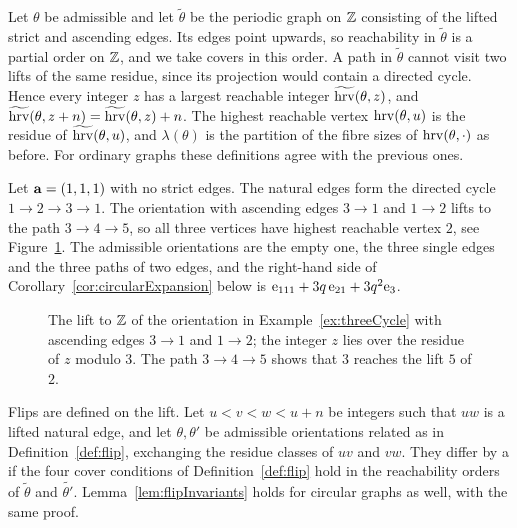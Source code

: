 Let $\theta$ be admissible and let $\widetilde{\theta}$ be the periodic
graph on $\mathbb{Z}$ consisting of the lifted strict and ascending edges.
Its edges point upwards, so reachability in $\widetilde{\theta}$ is a
partial order on $\mathbb{Z}$, and we take covers in this order.
A path in $\widetilde{\theta}$ cannot visit two lifts of the same residue,
since its projection would contain a directed cycle.
Hence every integer $z$ has a largest reachable integer
$\widetilde{\operatorname{hrv}}(\theta,z)$, and
$\widetilde{\operatorname{hrv}}(\theta,z+n)=\widetilde{\operatorname{hrv}}(\theta,z)+n$.
The highest reachable vertex $\operatorname{hrv}(\theta,u)$ is the residue of
$\widetilde{\operatorname{hrv}}(\theta,u)$, and $\lambda(\theta)$ is the partition of the
fibre sizes of $\operatorname{hrv}(\theta,\cdot)$ as before.
For ordinary graphs these definitions agree with the previous ones.

\begin{example}\label{ex:threeCycle}
Let $\mathbf{a}=(1,1,1)$ with no strict edges.
The natural edges form the directed cycle $1\to2\to3\to1$.
The orientation with ascending edges $3\to1$ and $1\to2$ lifts to the path
$3\to4\to5$, so all three vertices have highest reachable vertex $2$, see
Figure~\ref{fig:lift}.
The admissible orientations are the empty one, the three single edges and the
three paths of two edges, and the right-hand side of
Corollary~\ref{cor:circularExpansion} below is
$\mathrm{e}_{111}+3q\,\mathrm{e}_{21}+3q^2\mathrm{e}_3$.
\end{example}

\begin{figure}[!ht]
\centering
{}
\caption{The lift to $\mathbb{Z}$ of the orientation in Example~\ref{ex:threeCycle}
with ascending edges $3\to1$ and $1\to2$; the integer $z$ lies over the residue
of $z$ modulo $3$.
The path $3\to4\to5$ shows that $3$ reaches the lift $5$ of $2$.}
\label{fig:lift}
\end{figure}

Flips are defined on the lift.
Let $u<v<w<u+n$ be integers such that $uw$ is a lifted natural edge, and let
$\theta,\theta'$ be admissible orientations related as in
Definition~\ref{def:flip}, exchanging the residue classes of $uv$ and $vw$.
They differ by a  if the four cover conditions of
Definition~\ref{def:flip} hold in the reachability orders of
$\widetilde{\theta}$ and $\widetilde{\theta'}$.
Lemma~\ref{lem:flipInvariants} holds for circular graphs as well, with the same
proof.

